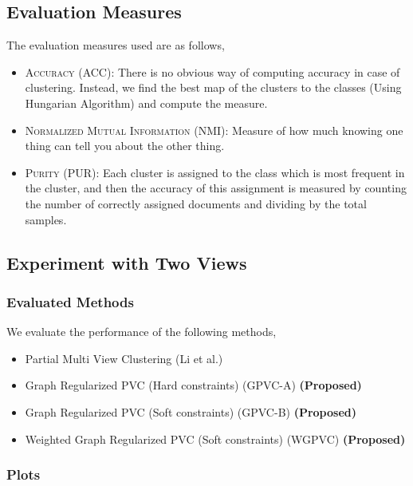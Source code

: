 \documentclass[a4paper]{article}
\begin{document}
	\subsection{Evaluation Measures}

	The evaluation measures used are as follows,
	\begin{itemize}
	\item \textsc{Accuracy (ACC):} There is no obvious way of computing accuracy in case of clustering. Instead, we find the best map of the clusters to the classes (Using Hungarian Algorithm) and compute the measure.
	\item \textsc{Normalized Mutual Information (NMI):} Measure of how much knowing one thing can tell you about the other thing.
	\item \textsc{Purity (PUR):} Each cluster is assigned to the class which is most frequent in the cluster, and then the accuracy of this assignment is measured by counting the number of correctly assigned documents and dividing by the total samples.
	\end{itemize}

	\subsection{Experiment with Two Views}	

	\subsubsection{Evaluated Methods}
		
	We evaluate the performance of the following methods,
	\begin{itemize}
	\item {Partial Multi View Clustering (Li et al.) ~\cite{pvc15}}
	\item {Graph Regularized PVC (Hard constraints) (GPVC-A)	\small\textbf{(Proposed)}}
	\item {Graph Regularized PVC (Soft constraints) (GPVC-B)	\small\textbf{(Proposed)}}
	\item {Weighted Graph Regularized PVC (Soft constraints) (WGPVC)	\small\textbf{(Proposed)}}
	\end{itemize}	


	\subsubsection{Plots}
		
\end{document}
